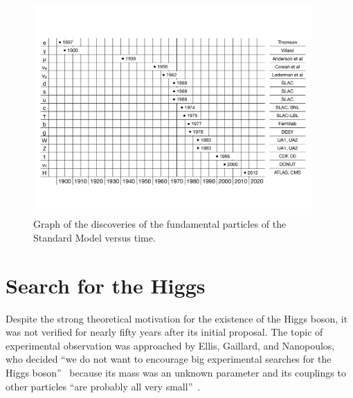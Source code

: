 \begin{figure}[tp]
  \centering
  \includegraphics[width=0.95\textwidth]{figures/standardmodel/discoveries}
  \caption{Graph of the discoveries of the fundamental particles of the Standard Model versus time.}
  \label{fig:sm-particles-2}
\end{figure}

\section{Search for the Higgs}

Despite the strong theoretical motivation for the existence of the Higgs boson, it was not verified for nearly fifty years after its initial proposal. The topic of experimental observation was approached by Ellis, Gaillard, and Nanopoulos, who decided ``we do not want to encourage big experimental searches for the Higgs boson''~\cite{1976.higgspheno} because its mass was an unknown parameter and its couplings to other particles ``are probably all very small''~\cite{1976.higgspheno}.

